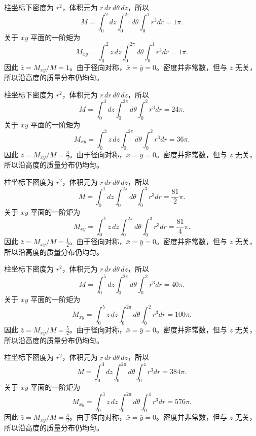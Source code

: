 \documentclass[12pt,fontset=fandol]{ctexart}
\begin{document}
\begin{solve}\label{ans:c38q19}
柱坐标下密度为 $r^2$，体积元为 $r\,dr\,d\theta\,dz$，所以
\[
M=\int_0^{2}dz\int_0^{2\pi}d\theta\int_0^{1}r^3dr=1\pi.
\]
关于 $xy$ 平面的一阶矩为
\[
M_{xy}=\int_0^{2}z\,dz\int_0^{2\pi}d\theta\int_0^{1}r^3dr=1\pi.
\]
因此 $\bar z=M_{xy}/M=1$。由于径向对称，$\bar x=\bar y=0$。密度并非常数，但与 $z$ 无关，所以沿高度的质量分布仍均匀。
\end{solve}

\begin{solve}\label{ans:c38q20}
柱坐标下密度为 $r^2$，体积元为 $r\,dr\,d\theta\,dz$，所以
\[
M=\int_0^{3}dz\int_0^{2\pi}d\theta\int_0^{2}r^3dr=24\pi.
\]
关于 $xy$ 平面的一阶矩为
\[
M_{xy}=\int_0^{3}z\,dz\int_0^{2\pi}d\theta\int_0^{2}r^3dr=36\pi.
\]
因此 $\bar z=M_{xy}/M=\frac{3}{2}$。由于径向对称，$\bar x=\bar y=0$。密度并非常数，但与 $z$ 无关，所以沿高度的质量分布仍均匀。
\end{solve}

\begin{solve}\label{ans:c38q21}
柱坐标下密度为 $r^2$，体积元为 $r\,dr\,d\theta\,dz$，所以
\[
M=\int_0^{1}dz\int_0^{2\pi}d\theta\int_0^{3}r^3dr=\frac{81}{2}\pi.
\]
关于 $xy$ 平面的一阶矩为
\[
M_{xy}=\int_0^{1}z\,dz\int_0^{2\pi}d\theta\int_0^{3}r^3dr=\frac{81}{4}\pi.
\]
因此 $\bar z=M_{xy}/M=\frac{1}{2}$。由于径向对称，$\bar x=\bar y=0$。密度并非常数，但与 $z$ 无关，所以沿高度的质量分布仍均匀。
\end{solve}

\begin{solve}\label{ans:c38q22}
柱坐标下密度为 $r^2$，体积元为 $r\,dr\,d\theta\,dz$，所以
\[
M=\int_0^{5}dz\int_0^{2\pi}d\theta\int_0^{2}r^3dr=40\pi.
\]
关于 $xy$ 平面的一阶矩为
\[
M_{xy}=\int_0^{5}z\,dz\int_0^{2\pi}d\theta\int_0^{2}r^3dr=100\pi.
\]
因此 $\bar z=M_{xy}/M=\frac{5}{2}$。由于径向对称，$\bar x=\bar y=0$。密度并非常数，但与 $z$ 无关，所以沿高度的质量分布仍均匀。
\end{solve}

\begin{solve}\label{ans:c38q23}
柱坐标下密度为 $r^2$，体积元为 $r\,dr\,d\theta\,dz$，所以
\[
M=\int_0^{3}dz\int_0^{2\pi}d\theta\int_0^{4}r^3dr=384\pi.
\]
关于 $xy$ 平面的一阶矩为
\[
M_{xy}=\int_0^{3}z\,dz\int_0^{2\pi}d\theta\int_0^{4}r^3dr=576\pi.
\]
因此 $\bar z=M_{xy}/M=\frac{3}{2}$。由于径向对称，$\bar x=\bar y=0$。密度并非常数，但与 $z$ 无关，所以沿高度的质量分布仍均匀。
\end{solve}
\end{document}
